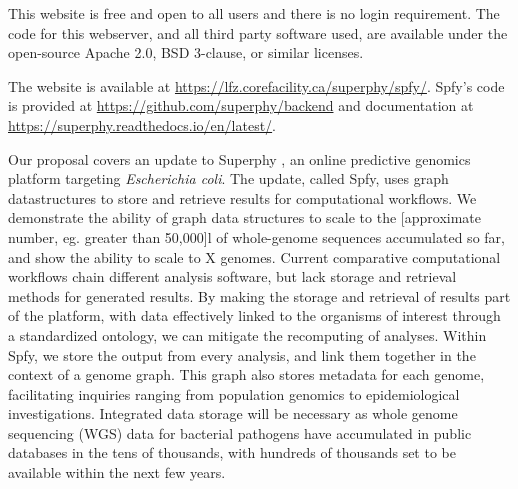 \documentclass{article}
\begin{document}
This website is free and open to all users and there is no login requirement. The code for this webserver, and all third party software used, are available under the open-source Apache 2.0, BSD 3-clause, or similar licenses. \para

The website is available at \url{https://lfz.corefacility.ca/superphy/spfy/}. Spfy's code is provided at \url{https://github.com/superphy/backend} and documentation at \url{https://superphy.readthedocs.io/en/latest/}. \para

Our proposal covers an update to Superphy \citep{whiteside2016superphy}, an online predictive genomics platform targeting \textit{Escherichia coli}.
The update, called Spfy, uses graph datastructures to store and retrieve results for computational workflows.
We demonstrate the ability of graph data structures to scale to the [approximate number, eg. greater than 50,000]l of whole-genome sequences  accumulated so far, and show the ability to scale to X genomes.
Current comparative computational workflows chain different analysis software, but lack storage and retrieval methods for generated results.
By making the storage and retrieval of results part of the platform, with data effectively linked to the organisms of interest through a standardized ontology, we can mitigate the recomputing of analyses.
Within Spfy, we store the output from every analysis, and link them together in the context of a genome graph. This graph also stores metadata for each genome, facilitating inquiries ranging from population genomics to epidemiological investigations.
Integrated data storage will be necessary as whole genome sequencing (WGS) data for bacterial pathogens have accumulated in public databases in the tens of thousands, with hundreds of thousands set to be available within the next few years. \para
\end{document}
